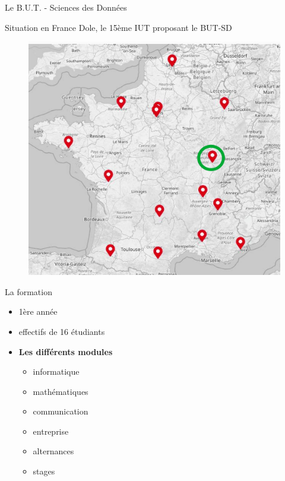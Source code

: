 \documentclass [xcolor=x11names,t] {beamer}
\begin{document}
\begin{frame}{Le B.U.T. - Sciences des Données }
    

\begin{minipage}{0.5\textwidth}
\begin{block}{Situation  en France}
Dole, le 15ème IUT proposant le BUT-SD
  
\begin{figure}
    \centering
    \includegraphics[scale=0.3]{img/dole.png}
\end{figure}
\end{block}
\end{minipage}\hfill
\begin{minipage}{0.45\textwidth}
\begin{block}{La formation}

     \begin{itemize}
        \item 1ère année
        \item effectifs de 16 étudiants
    \end{itemize}


\begin{itemize}
    \item \textbf{Les différents modules}
     \begin{itemize}
        \item informatique
        \item mathématiques
        \item communication
        \item entreprise
        \item alternances
        \item stages
    \end{itemize}   
\end{itemize}
\end{block}

\end{minipage}
\end{frame}
\end{document}
